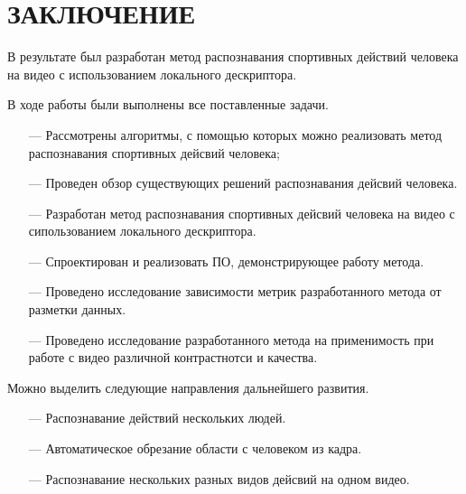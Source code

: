 \chapter*{ЗАКЛЮЧЕНИЕ}

В результате был разработан метод распознавания спортивных действий человека на видео с использованием локального дескриптора.

В ходе работы были выполнены все поставленные задачи.

\begin{itemize}
	\item[---] Рассмотрены алгоритмы, с помощью которых можно реализовать метод распознавания спортивных дейсвий человека;
	\item[---] Проведен обзор существующих решений распознавания дейсвий человека.
	\item[---] Разработан метод распознавания спортивных дейсвий человека на видео с сипользованием локального дескриптора.
	\item[---] Спроектирован и реализовать ПО, демонстрирующее работу метода.
	\item[---] Проведено исследование зависимости метрик разработанного метода от разметки данных.
	\item[---] Проведено исследование разработанного метода на применимость при работе с видео различной контрастнотси и качества.	
\end{itemize}

Можно выделить следующие направления дальнейшего развития.

\begin{itemize}
	\item[---] Распознавание действий нескольких людей.
	\item[---] Автоматическое обрезание области с человеком из кадра.
	\item[---] Распознавание нескольких разных видов дейсвий на одном видео.	
\end{itemize}